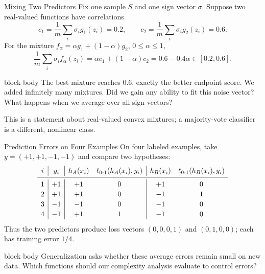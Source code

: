 \documentclass[aspectratio=169,10pt]{beamer}
\newcommand{\KeyBox}[1]{%
  \begin{beamercolorbox}[rounded=true,sep=0.22cm,wd=\linewidth]{block body}
    #1
  \end{beamercolorbox}%
}
\begin{document}
\begin{frame}[t]{Mixing Two Predictors}
  \vspace{0.03cm}
  \small
  Fix one sample $S$ and one sign vector $\sigma$.  Suppose two real-valued
  functions have correlations
  \[
    c_1=\frac1m\sum_i\sigma_i g_1(z_i)=0.2,
    \qquad
    c_2=\frac1m\sum_i\sigma_i g_2(z_i)=0.6.
  \]
  For the mixture $f_\alpha=\alpha g_1+(1-\alpha)g_2$, $0\le\alpha\le1$,
  \[
    \frac1m\sum_i\sigma_i f_\alpha(z_i)
      =\alpha c_1+(1-\alpha)c_2
      =0.6-0.4\alpha\in[0.2,0.6].
  \]
  \vspace{0.02cm}
  \KeyBox{\centering
    The best mixture reaches $0.6$, exactly the better endpoint score.
    We added infinitely many mixtures. Did we gain any ability to fit this
    noise vector? What happens when we average over all sign vectors?
  }
  \vspace{0.02cm}
  {\scriptsize This is a statement about real-valued convex mixtures; a
  majority-vote classifier is a different, nonlinear class.}
\end{frame}

\begin{frame}[t]{Prediction Errors on Four Examples}
  \vspace{0.02cm}
  \small
  On four labeled examples, take
  $y=(+1,+1,-1,-1)$ and compare two hypotheses:
  \[
  \renewcommand{\arraystretch}{1.16}
  \begin{array}{c|c|cc|cc}
    i & y_i & h_A(x_i) & \ell_{0\text{-}1}(h_A(x_i),y_i)
        & h_B(x_i) & \ell_{0\text{-}1}(h_B(x_i),y_i)\\
    \midrule
    1 & +1 & +1 & 0 & +1 & 0\\
    2 & +1 & +1 & 0 & -1 & 1\\
    3 & -1 & -1 & 0 & -1 & 0\\
    4 & -1 & +1 & 1 & -1 & 0
  \end{array}
  \]
  Thus the two predictors produce loss vectors $(0,0,0,1)$ and $(0,1,0,0)$;
  each has training error $1/4$.
  \vspace{0.02cm}
  \KeyBox{\centering
    Generalization asks whether these average errors remain small on new data.
    Which functions should our complexity analysis evaluate to control errors?
  }
\end{frame}
\end{document}
